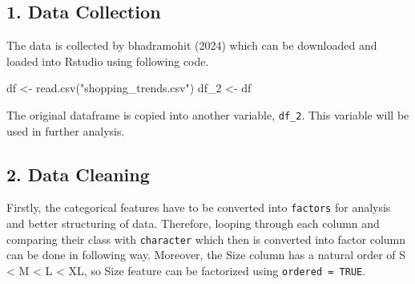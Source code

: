 \documentclass[
  letterpaper,
  DIV=11,
  numbers=noendperiod]{scrartcl}
\newenvironment{Shaded}{\begin{snugshade}}{\end{snugshade}}
\newcommand{\AttributeTok}[1]{\textcolor[rgb]{0.40,0.45,0.13}{#1}}
\newcommand{\CommentTok}[1]{\textcolor[rgb]{0.37,0.37,0.37}{#1}}
\newcommand{\ConstantTok}[1]{\textcolor[rgb]{0.56,0.35,0.01}{#1}}
\newcommand{\ControlFlowTok}[1]{\textcolor[rgb]{0.00,0.23,0.31}{\textbf{#1}}}
\newcommand{\FunctionTok}[1]{\textcolor[rgb]{0.28,0.35,0.67}{#1}}
\newcommand{\NormalTok}[1]{\textcolor[rgb]{0.00,0.23,0.31}{#1}}
\newcommand{\OtherTok}[1]{\textcolor[rgb]{0.00,0.23,0.31}{#1}}
\newcommand{\SpecialCharTok}[1]{\textcolor[rgb]{0.37,0.37,0.37}{#1}}
\newcommand{\StringTok}[1]{\textcolor[rgb]{0.13,0.47,0.30}{#1}}
\begin{document}
\subsection{1. Data Collection}\label{data-collection}

The data is collected by bhadramohit (2024) which can be downloaded and
loaded into Rstudio using following code.

\begin{Shaded}
\begin{Highlighting}[]
\NormalTok{df }\OtherTok{\textless{}{-}} \FunctionTok{read.csv}\NormalTok{(}\StringTok{"shopping\_trends.csv"}\NormalTok{)}
\NormalTok{df\_2 }\OtherTok{\textless{}{-}}\NormalTok{ df}
\end{Highlighting}
\end{Shaded}

The original dataframe is copied into another variable, \texttt{df\_2}.
This variable will be used in further analysis.

\subsection{2. Data Cleaning}\label{data-cleaning}

Firstly, the categorical features have to be converted into
\texttt{factors} for analysis and better structuring of data. Therefore,
looping through each column and comparing their class with
\texttt{character} which then is converted into factor column can be
done in following way. Moreover, the Size column has a natural order of
S \textless{} M \textless{} L \textless{} XL, so Size feature can be
factorized using \texttt{ordered\ =\ TRUE}.

\begin{Shaded}
\end{Shaded}
\end{document}
